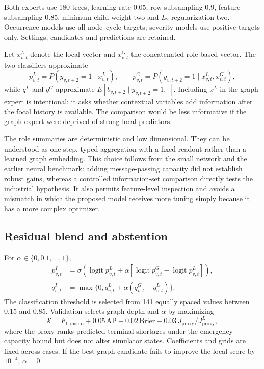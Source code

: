 \documentclass[11pt,a4paper]{article}
\begin{document}
Both experts use 180 trees, learning rate 0.05, row subsampling 0.9, feature subsampling 0.85, minimum child weight two and $L_2$ regularization two. Occurrence models use all node--cycle targets; severity models use positive targets only. Settings, candidates and predictions are retained.

Let $x^L_{v,t}$ denote the local vector and $x^G_{v,t}$ the concatenated role-based vector. The two classifiers approximate
\begin{equation}
p^L_{v,t}=P(y_{v,t+2}=1\mid x^L_{v,t}),\qquad
p^G_{v,t}=P(y_{v,t+2}=1\mid x^L_{v,t},x^G_{v,t}),
\end{equation}
while $q^L$ and $q^G$ approximate $E[b_{v,t+2}\mid y_{v,t+2}=1,\cdot]$. Including $x^L$ in the graph expert is intentional: it asks whether contextual variables add information after the focal history is available. The comparison would be less informative if the graph expert were deprived of strong local predictors.

The role summaries are deterministic and low dimensional. They can be understood as one-step, typed aggregation with a fixed readout rather than a learned graph embedding. This choice follows from the small network and the earlier neural benchmark: adding message-passing capacity did not establish robust gains, whereas a controlled information-set comparison directly tests the industrial hypothesis. It also permits feature-level inspection and avoids a mismatch in which the proposed model receives more tuning simply because it has a more complex optimizer.

\subsection{Residual blend and abstention}
For $\alpha\in\{0,0.1,\ldots,1\}$,
\begin{align}p^{I}_{v,t}&=\sigma\!\left(\operatorname{logit}p^L_{v,t}+\alpha[\operatorname{logit}p^G_{v,t}-\operatorname{logit}p^L_{v,t}]\right),\\
q^{I}_{v,t}&=\max\{0,q^L_{v,t}+\alpha(q^G_{v,t}-q^L_{v,t})\}.
\end{align}
The classification threshold is selected from 141 equally spaced values between 0.15 and 0.85. Validation selects graph depth and $\alpha$ by maximizing
\begin{equation}\mathcal S=F_{1,\mathrm{macro}}+0.05\,\mathrm{AP}-0.02\,\mathrm{Brier}-0.03\,J_{\mathrm{proxy}}/J_{\mathrm{proxy}}^{L},\end{equation}
where the proxy ranks predicted terminal shortages under the emergency-capacity bound but does not alter simulator states. Coefficients and grids are fixed across cases. If the best graph candidate fails to improve the local score by $10^{-4}$, $\alpha=0$.
\end{document}
